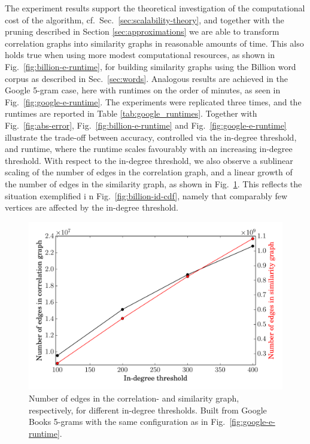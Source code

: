 \documentclass{kais}
\begin{document}
The experiment results support the theoretical investigation of the computational
cost of the algorithm, cf.~Sec.~\ref{sec:scalability-theory}, and together with the pruning
described in Section \ref{sec:approximations} we are able to transform correlation graphs into similarity
graphs in reasonable amounts of time. This also holds true when using more modest computational resources,
as shown in Fig.\ \ref{fig:billion-e-runtime}, for building similarity graphs using the Billion word corpus as described
in Sec.\ \ref{sec:words}. Analogous results are achieved in the Google 5-gram case, here with runtimes on the order of minutes,
as seen in Fig.\ \ref{fig:google-e-runtime}. The experiments were replicated three times, and
the runtimes are reported in Table \ref{tab:google_runtimes}.
Together with Fig.\ \ref{fig:abs-error}, Fig.\ \ref{fig:billion-e-runtime} and Fig.\ \ref{fig:google-e-runtime} illustrate the trade-off between accuracy, controlled
via the in-degree threshold, and runtime, where the runtime scales favourably with an increasing in-degree threshold.
With respect to the in-degree threshold, we also observe a sublinear scaling of the number of edges in the correlation
graph, and a linear growth of the number of  edges in the similarity graph,  as shown in Fig.\ \ref{fig:google-ne}. This reflects the situation exemplified i
n Fig.\ \ref{fig:billion-id-cdf}, namely that comparably few vertices are affected by the in-degree threshold.

\begin{figure}
\centerline{\includegraphics[width=0.75\columnwidth]{figures/eng-all-edge-low-e3-vtx-low-e8-high-e1-100-400-idg-ne-nt.pdf}}
\caption{Number of edges in the correlation- and similarity graph, respectively, for different in-degree thresholds. Built from Google Books 5-grams
with the same configuration as in Fig.\ \ref{fig:google-e-runtime}.}
\label{fig:google-ne}
\end{figure}
\end{document}
